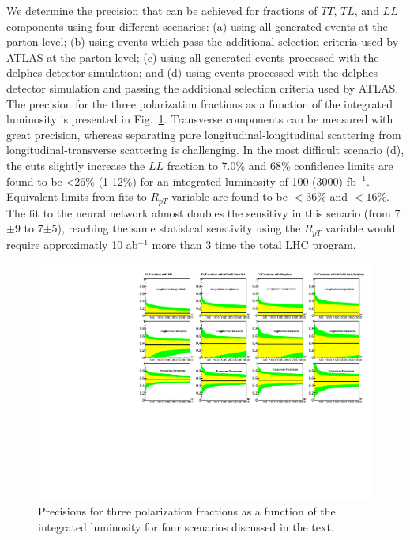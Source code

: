 We determine the precision that can be achieved for fractions of $TT$, $TL$, and $LL$ components using four different scenarios: (a) using all  generated events at the parton level; 
(b) using events which pass the additional selection criteria used by ATLAS at the parton level; 
(c) using all generated events processed with the {\sc delphes} detector simulation; and (d) using events processed with the {\sc delphes} detector simulation and passing the additional selection criteria used by ATLAS. 
The precision for the three polarization fractions as a function of the integrated luminosity is presented in Fig.~\ref{fig:sensitivity}. 
 Transverse components can be measured with great precision, whereas separating pure longitudinal-longitudinal scattering from longitudinal-transverse scattering is challenging.
In the most difficult scenario (d), the cuts slightly increase the $LL$ fraction to 7.0\% and 68\% confidence limits are found to be  <26\% (1-12\%) for an integrated luminosity of 100 (3000) fb$^{-1}$.  Equivalent limits from fits to $R_{pT}$ variable are found to be $<36\%$ and $<16\%$. The fit to the neural network almost doubles the sensitivy in this senario (from 7$\pm$9 to 7$\pm5$), reaching the same statistcal senstivity using the $R_{pT}$ variable would require approximatly 10 ab$^{-1}$ more than 3 time the total LHC program.

\begin{figure}
\includegraphics[width=.9\textwidth]{./fig/12_LL_LT_TT.pdf}
\caption{ \label{fig:sensitivity} Precisions for three polarization fractions as a function of the integrated luminosity for four scenarios discussed in the text.}
\end{figure}


